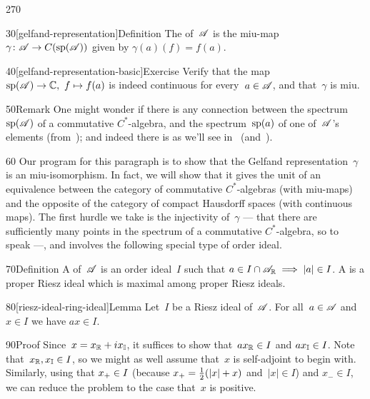 \begin{parsec}{270}
\begin{point}{30}[gelfand-representation]{Definition}
The 
of~$\mathscr{A}$
is the miu-map~$\gamma\colon \mathscr{A}\to C(\mathrm{sp}(\mathscr{A}))$%
given by $\gamma(a)(f)=f(a)$.
\end{point}
\begin{point}{40}[gelfand-representation-basic]{Exercise}%
Verify that 
 the map $\spec(\scrA)\to \C,\ f\mapsto f(a)$ is indeed
continuous for every~$a\in\mathscr{A}$,
and that~$\gamma$ is miu.
\end{point}
\begin{point}{50}{Remark}
One might wonder if there is any connection between
the spectrum~$\mathrm{sp}(\mathscr{A})$
of a commutative $C^*$-algebra,
and the spectrum~$\mathrm{sp}(a)$
of one of~$\mathscr{A}$'s elements (from~);
and indeed there is
as we'll see in~
(and~).
\end{point}
\begin{point}{60}%
Our program for this paragraph is to show that
the Gelfand representation~$\gamma$ is 
an miu-isomorphism.
In fact,
we will show that it gives the unit
of an equivalence between the category of commutative $C^*$-algebras
(with miu-maps)
and the opposite of the category of compact Hausdorff spaces
(with continuous maps).
The first hurdle we take is the injectivity of~$\gamma$
--- that there are sufficiently many
points in the spectrum of a commutative $C^*$-algebra,
so to speak ---,
and involves
the following special type of order ideal.
\end{point}
\begin{point}{70}{Definition}%
A %
of~$\mathscr{A}$
is an order ideal~$I$
such that $a\in I\cap\mathscr{A}_{\mathbb{R}}\implies \left|a\right|\in I$.
A %
is a proper Riesz ideal which is maximal among
proper Riesz ideals.
\end{point}
\begin{point}{80}[riesz-ideal-ring-ideal]{Lemma}%
Let~$I$ be a Riesz ideal of~$\mathscr{A}$.
For all~$a\in \mathscr{A}$ and $x\in I$ we have $ax\in I$.
\begin{point}{90}{Proof}%
Since~$x=x_{\mathbb{R}}+ix_{\mathbb{I}}$,
it suffices to show that~$ax_{\mathbb{R}}\in I$ and $ax_{\mathbb{I}}\in I$.
Note that~$x_{\mathbb{R}},x_{\mathbb{I}}\in I$,
so we might as well assume that~$x$ is self-adjoint to begin with.
Similarly, using that
 $x_{+}\in I$ (because $x_{+}=\frac{1}{2}(\left|x\right|+x)$
and~$\left|x\right|\in I$) and $x_-\in I$,
we can reduce the problem to the case that~$x$ is positive.

\end{point}
\end{point}
\end{parsec}
